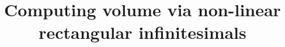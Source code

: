 \documentclass{article}
\theoremstyle{theorem}
\theoremstyle{definition}
\begin{document}
\title{Computing volume via non-linear rectangular infinitesimals}

\maketitle


\end{document}
